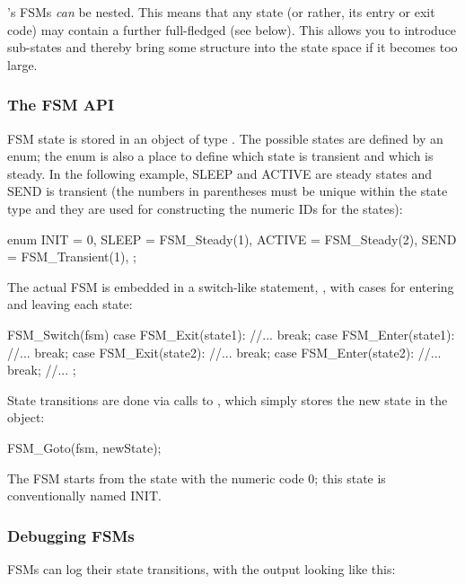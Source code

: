{\opp}'s FSMs \textit{can} be nested. This means
that any state (or rather, its entry or exit code) may contain a
further full-fledged  (see below). This allows you
to introduce sub-states and thereby bring some structure into the
state space if it becomes too large.


\subsubsection{The FSM API}
\label{sec:simple-modules:fsm-api}

FSM state is stored in an object of type . The possible states
are defined by an enum; the enum is also a place to define which
state is transient and which is steady. In the following example, SLEEP
and ACTIVE are steady states and SEND is transient (the numbers
in parentheses must be unique within the state type and they are used
for constructing the numeric IDs for the states):

\begin{cpp}
enum {
  INIT = 0,
  SLEEP = FSM_Steady(1),
  ACTIVE = FSM_Steady(2),
  SEND = FSM_Transient(1),
};
\end{cpp}

The actual FSM is embedded in a switch-like statement, ,
with cases for entering and leaving each state:

\begin{cpp}
FSM_Switch(fsm)
{
  case FSM_Exit(state1):
    //...
    break;
  case FSM_Enter(state1):
    //...
    break;
  case FSM_Exit(state2):
    //...
    break;
  case FSM_Enter(state2):
    //...
    break;
  //...
};
\end{cpp}


State transitions are done via calls to
, which simply stores the new state in the
 object:

\begin{cpp}
FSM_Goto(fsm, newState);
\end{cpp}

The FSM starts from the state with the numeric code 0; this state
is conventionally named INIT.


\subsubsection{Debugging FSMs}
\label{sec:simple-modules:debugging-fsms}

FSMs can log their state transitions, with the output looking like this:

